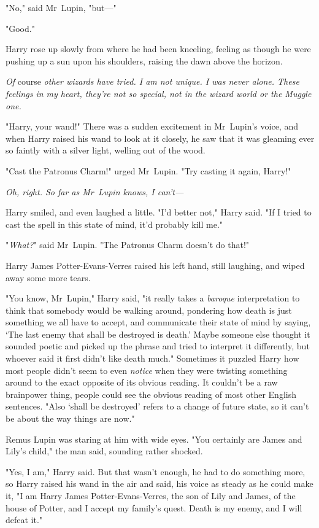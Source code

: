 "No," said Mr~Lupin, "but---"

"Good."

Harry rose up slowly from where he had been kneeling, feeling as though he were
pushing up a sun upon his shoulders, raising the dawn above the horizon.

\emph{Of} course \emph{other wizards have tried. I am not unique. I was never
alone. These feelings in my heart, they're not so special, not in the wizard
world or the Muggle one.}

"Harry, your wand!" There was a sudden excitement in Mr~Lupin's voice, and
when Harry raised his wand to look at it closely, he saw that it was gleaming
ever so faintly with a silver light, welling out of the wood.

"Cast the Patronus Charm!" urged Mr~Lupin. "Try casting it again, Harry!"

\emph{Oh, right. So far as Mr~Lupin knows, I can't---}

Harry smiled, and even laughed a little. "I'd better not," Harry said. "If I
tried to cast the spell in this state of mind, it'd probably kill me."

"\emph{What?}" said Mr~Lupin. "The Patronus Charm doesn't do that!"

Harry James Potter-Evans-Verres raised his left hand, still laughing, and wiped
away some more tears.

"You know, Mr~Lupin," Harry said, "it really takes a \emph{baroque}
interpretation to think that somebody would be walking around, pondering how
death is just something we all have to accept, and communicate their state of
mind by saying, `The last enemy that shall be destroyed is death.' Maybe
someone else thought it sounded poetic and picked up the phrase and tried to
interpret it differently, but whoever said it first didn't like death much."
Sometimes it puzzled Harry how most people didn't seem to even \emph{notice}
when they were twisting something around to the exact opposite of its
obvious reading. It couldn't be a raw brainpower thing, people could see
the obvious reading of most other English sentences. "Also `shall be destroyed'
refers to a change of future state, so it can't be about the way things are
now."

Remus Lupin was staring at him with wide eyes. "You certainly are James and
Lily's child," the man said, sounding rather shocked.

"Yes, I am," Harry said. But that wasn't enough, he had to do something more,
so Harry raised his wand in the air and said, his voice as steady as he could
make it, "I am Harry James Potter-Evans-Verres, the son of Lily and James, of
the house of Potter, and I accept my family's quest. Death is my enemy, and I
will defeat it."

